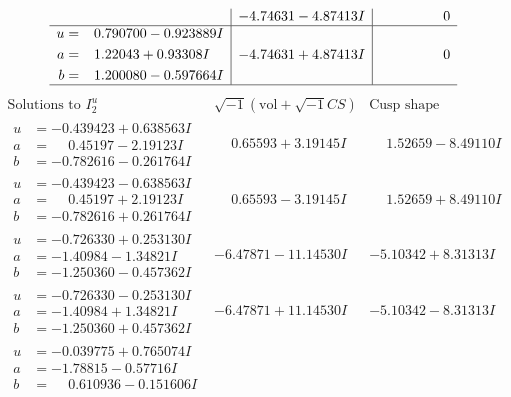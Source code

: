 \documentclass[1p]{elsarticle_modified}
\theoremstyle{definition}
\newcommand{\I}{\sqrt{-1}}
\begin{document}
$$\begin{array}{c|c|c}
 & -4.74631 - 4.87413 I & \phantom{-0.000000 } 0 \\ \hline\begin{aligned}
u &= \phantom{-}0.790700 - 0.923889 I \\
a &= \phantom{-}1.22043 + 0.93308 I \\
b &= \phantom{-}1.200080 - 0.597664 I\end{aligned}
 & -4.74631 + 4.87413 I & \phantom{-0.000000 } 0\\
 \hline 
 \end{array}$$\newpage$$\begin{array}{c|c|c}  
\text{Solutions to }I^u_{2}& \I (\text{vol} + \sqrt{-1}CS) & \text{Cusp shape}\\
 \hline 
\begin{aligned}
u &= -0.439423 + 0.638563 I \\
a &= \phantom{-}0.45197 - 2.19123 I \\
b &= -0.782616 - 0.261764 I\end{aligned}
 & \phantom{-}0.65593 + 3.19145 I & \phantom{-}1.52659 - 8.49110 I \\ \hline\begin{aligned}
u &= -0.439423 - 0.638563 I \\
a &= \phantom{-}0.45197 + 2.19123 I \\
b &= -0.782616 + 0.261764 I\end{aligned}
 & \phantom{-}0.65593 - 3.19145 I & \phantom{-}1.52659 + 8.49110 I \\ \hline\begin{aligned}
u &= -0.726330 + 0.253130 I \\
a &= -1.40984 - 1.34821 I \\
b &= -1.250360 - 0.457362 I\end{aligned}
 & -6.47871 - 11.14530 I & -5.10342 + 8.31313 I \\ \hline\begin{aligned}
u &= -0.726330 - 0.253130 I \\
a &= -1.40984 + 1.34821 I \\
b &= -1.250360 + 0.457362 I\end{aligned}
 & -6.47871 + 11.14530 I & -5.10342 - 8.31313 I \\ \hline\begin{aligned}
u &= -0.039775 + 0.765074 I \\
a &= -1.78815 - 0.57716 I \\
b &= \phantom{-}0.610936 - 0.151606 I\end{aligned}

\end{array}$$
\end{document}
